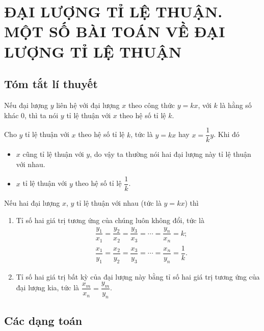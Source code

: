 \section{ĐẠI LƯỢNG TỈ LỆ THUẬN. MỘT SỐ BÀI TOÁN VỀ ĐẠI LƯỢNG TỈ LỆ THUẬN}
\subsection{Tóm tắt lí thuyết}
\begin{dn}
 Nếu đại lượng $y$ liên hệ với đại lượng $x$ theo công thức $y=kx$, với $k$ là hằng số khác $0$, thì ta nói $y$ tỉ lệ thuận với $x$ theo hệ số tỉ lệ $k$.
\end{dn}

\begin{note}
 Cho $y$ tỉ lệ thuận với $x$ theo hệ số tỉ lệ $k$, tức là $y=kx$ hay $x=\dfrac{1}{k}y$. Khi đó
 \begin{itemize}
  \item $x$ cũng tỉ lệ thuận với $y$, do vậy ta thường nói hai đại lượng này tỉ lệ thuận với nhau.
  \item $x$ tỉ lệ thuận với $y$ theo hệ số tỉ lệ $\dfrac{1}{k}$.
 \end{itemize}
\end{note}

\begin{tc}
 Nếu hai đại lượng $x$, $y$ tỉ lệ thuận với nhau (tức là $y=kx$) thì
 \begin{enumerate}
  \item Tỉ số hai giá trị tương ứng của chúng luôn không đổi, tức là
  \begin{eqnarray*}
   & \dfrac{y_1}{x_1} = \dfrac{y_2}{x_2} = \dfrac{y_3}{x_3} = \cdots = \dfrac{y_n}{x_n} = k;\\
   & \dfrac{x_1}{y_1} = \dfrac{x_2}{y_2} = \dfrac{x_3}{y_3} = \cdots = \dfrac{x_n}{y_n} = \dfrac{1}{k}.
  \end{eqnarray*}
  \item Tỉ số hai giá trị bất kỳ của đại lượng này bằng tỉ số hai giá trị tương ứng của đại lượng kia, tức là $\dfrac{x_m}{x_n} = \dfrac{y_m}{y_n}$.
 \end{enumerate}
\end{tc}


\subsection{Các dạng toán}


